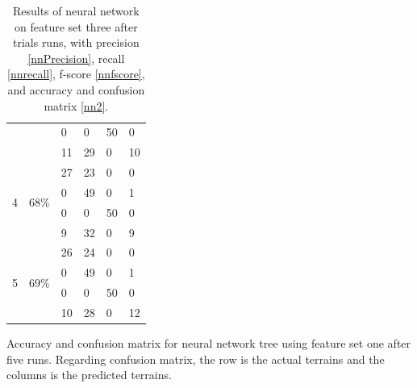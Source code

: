 \documentclass[USenglish]{ifimaster}  %
\begin{document}
\begin{table}[h]
\begin{subtable}[h]{1\textwidth}
\begin{tabular}{@{}llllll@{}}
			\multicolumn{1}{l|}{} & \multicolumn{1}{l|}{} & \multicolumn{1}{l|}{0} & \multicolumn{1}{l|}{0} & \multicolumn{1}{l|}{50} & 0 \\ \cmidrule(l){3-6} 
			\multicolumn{1}{l|}{} & \multicolumn{1}{l|}{} & \multicolumn{1}{l|}{11} & \multicolumn{1}{l|}{29} & \multicolumn{1}{l|}{0} & 10 \\ \midrule
			\multicolumn{1}{l|}{\multirow{4}{*}{4}} & \multicolumn{1}{l|}{\multirow{4}{*}{68\%}} & \multicolumn{1}{l|}{27} & \multicolumn{1}{l|}{23} & \multicolumn{1}{l|}{0} & 0 \\ \cmidrule(l){3-6} 
			\multicolumn{1}{l|}{} & \multicolumn{1}{l|}{} & \multicolumn{1}{l|}{0} & \multicolumn{1}{l|}{49} & \multicolumn{1}{l|}{0} & 1 \\ \cmidrule(l){3-6} 
			\multicolumn{1}{l|}{} & \multicolumn{1}{l|}{} & \multicolumn{1}{l|}{0} & \multicolumn{1}{l|}{0} & \multicolumn{1}{l|}{50} & 0 \\ \cmidrule(l){3-6} 
			\multicolumn{1}{l|}{} & \multicolumn{1}{l|}{} & \multicolumn{1}{l|}{9} & \multicolumn{1}{l|}{32} & \multicolumn{1}{l|}{0} & 9 \\ \midrule
			\multicolumn{1}{l|}{\multirow{4}{*}{5}} & \multicolumn{1}{l|}{\multirow{4}{*}{69\%}} & \multicolumn{1}{l|}{26} & \multicolumn{1}{l|}{24} & \multicolumn{1}{l|}{0} & 0 \\ \cmidrule(l){3-6} 
			\multicolumn{1}{l|}{} & \multicolumn{1}{l|}{} & \multicolumn{1}{l|}{0} & \multicolumn{1}{l|}{49} & \multicolumn{1}{l|}{0} & 1 \\ \cmidrule(l){3-6} 
			\multicolumn{1}{l|}{} & \multicolumn{1}{l|}{} & \multicolumn{1}{l|}{0} & \multicolumn{1}{l|}{0} & \multicolumn{1}{l|}{50} & 0 \\ \cmidrule(l){3-6} 
			\multicolumn{1}{l|}{} & \multicolumn{1}{l|}{} & \multicolumn{1}{l|}{10} & \multicolumn{1}{l|}{28} & \multicolumn{1}{l|}{0} & 12 \\ \bottomrule
		\end{tabular}
		\caption{Accuracy and confusion matrix for neural network tree using feature set one after five runs. Regarding confusion matrix, the row is the actual terrains and the columns is the predicted terrains.}
		\label{nn2}
	\end{subtable}
	\caption[Results of neural network on feature set one]{Results of neural network on feature set three after trials runs, with precision \ref{nnPrecision}, recall \ref{nnrecall}, f-score \ref{nnfscore}, and accuracy and confusion matrix \ref{nn2}.}
	\label{tab:binary4}
\end{table}
\end{document}
